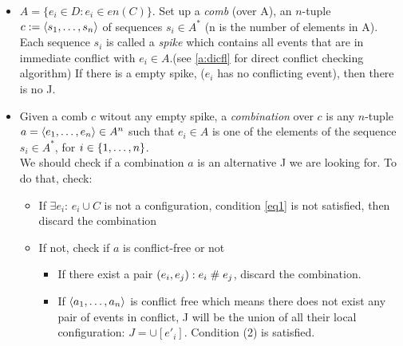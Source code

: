 \documentclass{llncs}
\begin{document}
\begin{itemize}
\item 
	$A = \{e_i \in D: e_i \in en(C)\}$.
	Set up a \emph{comb} (over A),
	an $n$-tuple $c \mathrel{:=} \langle s_1, \ldots, s_n\rangle$ of sequences $s_i \in A^*$
	(n is the number of elements in A).
	Each sequence $s_i$ is called a \emph{spike} 
	which contains all events that are in immediate conflict with $e_{i} \in A$.(see \cref{a:dicfl} for direct conflict checking algorithm)
	If there is a empty spike, ($e_i$ has no conflicting event), then there is no J.
\item
	Given a comb $c$ witout any empty spike, a \emph{combination} over $c$ is any $n$-tuple $a = \langle e_1, \ldots, e_n\rangle \in A^n$ such that $e_i \in A$ is one of the elements of the sequence $s_i \in A^*$, for $i \in {\{ 1, \ldots, n \mathclose \}}$. \\
	We should check if a combination $a$ is an alternative J we are looking for. To do that, check:
	
\begin{itemize}
	\item
		If $\exists e_i$: $e_i \cup C$ is not a configuration, condition \eqref{eq1} is not satisfied, 
		then discard the combination
	\item
		If not, check if $a$ is conflict-free or not
		\begin{itemize}
			\item
				If there exist a pair $(e_i, e_j): e_i \mathrel{\#} e_j$, discard the combination.
			\item
				If $\langle a_1, \ldots, a_n\rangle$ is conflict free which means there does not exist any pair 
				of events in conflict, J will be the union of all their local configuration:
				$ J = \cup [e'_i]$. Condition (2) is satisfied.
		\end{itemize}
\end{itemize}
\end{itemize}
\end{document}
